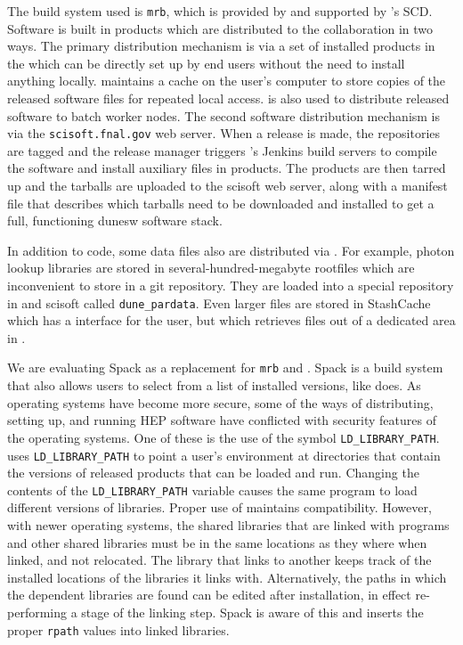 \documentclass[../main-v1.tex]{subfiles}
\begin{document}
The build system used is {\tt mrb}, which is provided by and supported by 's SCD.  Software is built in  products which are distributed to the collaboration in two ways.  The primary distribution mechanism is via a set of installed products in the  which can be directly set up by end users without the need to install anything locally.   maintains a cache on the user's computer to store copies of the released software files for repeated local access.   is also used to distribute released software to batch worker nodes.  The second software distribution mechanism is via the {\tt scisoft.fnal.gov} web server.  When a release is made, the repositories are tagged and the release manager triggers 's Jenkins build servers to compile the software and install auxiliary files in  products.  The  products are then tarred up and the tarballs are uploaded to the scisoft web server, along with a manifest file that describes which tarballs need to be downloaded and installed to get a full, %
functioning dunesw software stack.

In addition to code, some data files also are distributed via .  For example, photon lookup libraries are stored in several-hundred-megabyte rootfiles which are inconvenient to store in a git repository.  They are loaded into a special repository in  and scisoft called {\tt dune\_pardata}.  Even larger files are stored in StashCache which has a  interface for the user, but which retrieves files out of a dedicated area in .

We are evaluating Spack as a replacement for {\tt mrb} and .  Spack is a build system that also allows users to select from a list of installed versions, like  does.  As operating systems have become more secure, some of the ways of distributing, setting up, and running HEP software have conflicted with security features of the operating systems.  
One of these is the use of the symbol {\tt LD\_LIBRARY\_PATH}.   uses {\tt LD\_LIBRARY\_PATH} to point a user's environment at directories that contain the versions of released products that can be loaded and run.  Changing the contents of the {\tt LD\_LIBRARY\_PATH} variable causes the same program to load different versions of libraries.  Proper use of  maintains compatibility.  However, with newer operating systems, the shared libraries that are linked with programs and other shared libraries must be in the same locations as they where when linked, and not relocated.  The library that links to another keeps track of the installed locations of the libraries it links with.  Alternatively, the paths in which the dependent libraries are found can be edited after installation, in effect re-performing a stage of the linking step.  Spack is aware of this and inserts the proper {\tt rpath} values into linked libraries.
\end{document}
